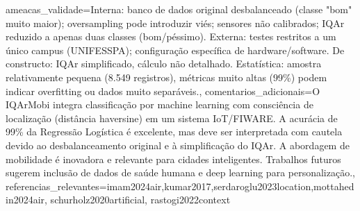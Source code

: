 \documentclass[12pt,a4paper]{article}
\begin{document}
{  ameacas_validade={Interna: banco de dados original desbalanceado (classe "bom" muito maior); oversampling pode introduzir viés; sensores não calibrados; IQAr reduzido a apenas duas classes (bom/péssimo). Externa: testes restritos a um único campus (UNIFESSPA); configuração específica de hardware/software. De constructo: IQAr simplificado, cálculo não detalhado. Estatística: amostra relativamente pequena (8.549 registros), métricas muito altas (99\%) podem indicar overfitting ou dados muito separáveis.},
  comentarios_adicionais={O IQArMobi integra classificação por machine learning com consciência de localização (distância haversine) em um sistema IoT/FIWARE. A acurácia de 99\% da Regressão Logística é excelente, mas deve ser interpretada com cautela devido ao desbalanceamento original e à simplificação do IQAr. A abordagem de mobilidade é inovadora e relevante para cidades inteligentes. Trabalhos futuros sugerem inclusão de dados de saúde humana e deep learning para personalização.},
  referencias_relevantes={imam2024air,kumar2017,serdaroglu2023location,mottahedin2024air, schurholz2020artificial, rastogi2022context}
}
\end{document}
